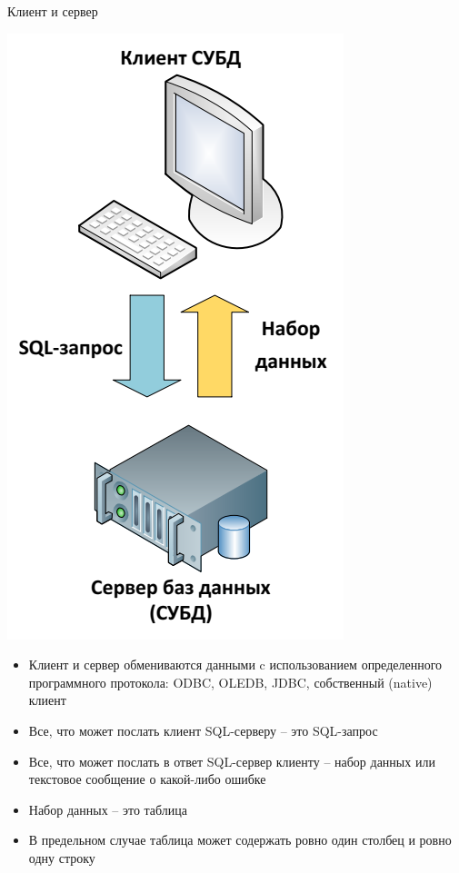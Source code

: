 \documentclass{beamer}
\begin{document}
\begin{frame}{Клиент и сервер}
\begin{minipage}{0.3\textwidth}
  \begin{flushleft}
	\begin{center}
		\includegraphics[scale=0.3]{images/Server.png}
	\end{center}
  \end{flushleft}
\end{minipage}
\begin{minipage}{0.6\textwidth}
  \begin{flushright}
	\begin{itemize}
		\item Клиент и сервер обмениваются
данными c использованием
определенного программного
протокола: ODBC, OLEDB, JDBC,
собственный (native) клиент
		\item Все, что может послать клиент
SQL-серверу – это SQL-запрос
		\item Все, что может послать в ответ
SQL-сервер клиенту – набор
данных или текстовое сообщение
о какой-либо ошибке
\item Набор данных – это таблица
\item В предельном случае таблица
может содержать ровно один
столбец и ровно одну строку
\end{itemize}
  \end{flushright}
\end{minipage}
\end{frame}
\end{document}

